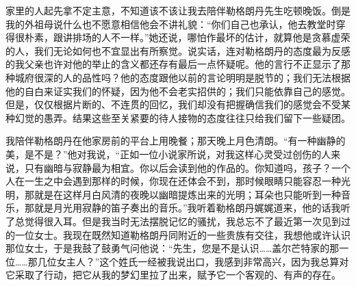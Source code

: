 \par 家里的人起先拿不定主意，不知道该不该让我去陪伴勒格朗丹先生吃顿晚饭。倒是我的外祖母说什么也不愿意相信他会不讲礼貌：“你们自己也承认，他去教堂时穿得很朴素，跟讲排场的人不一样。”她还说，哪怕作最坏的估计，就算他是贪慕虚荣的人，我们无论如何也不宜显出有所察觉。说实话，连对勒格朗丹的态度最为反感的我父亲也许对他的举止的含义都还存有最后一点怀疑呢。他的言行不正显示了那种城府很深的人的品性吗？他的态度跟他以前的言论明明是脱节的；我们无法根据他的自白来证实我们的怀疑，因为他不会老实招供的；我们只能依靠自己的感觉。但是，仅仅根据片断的、不连贯的回忆，我们却没有把握确信我们的感觉会不受某种幻觉的愚弄。结果这些至关紧要的待人接物的态度往往只给我们留下一些疑团。
\par 我陪伴勒格朗丹在他家房前的平台上用晚餐；那天晚上月色清朗。“有一种幽静的美，是不是？”他对我说，“正如一位小说家所说，对我这样心灵受过创伤的人来说，只有幽暗与寂静最为相宜。你以后会读到他的作品的。你知道吗，孩子？一个人在一生之中会遇到那样的时候，你现在还体会不到，那时候眼睛只能容忍一种光明，那就是在这样月白风清的夜晚以幽暗提炼出来的光明；耳朵也只能听到一种音乐，那就是月光用寂静的笛子奏出的音乐。”我听着勒格朗丹娓娓道来，他的话我听了总觉得很入耳。但是我当时无法摆脱记忆的骚扰，我总忘不了最近第一次见到过的一位女士。我现在既然知道勒格朗丹同附近的一些贵族有交往，我想他或许认识那位女士，于是我鼓了鼓勇气问他说：“先生，您是不是认识……盖尔芒特家的那一位……那几位女主人？”这个姓氏一经被我说出口，我感到非常高兴，因为我总算对它采取了行动，把它从我的梦幻里拉了出来，赋予它一个客观的、有声的存在。

